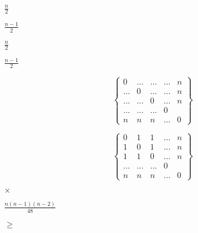 \documentclass[10pt]{book}
\begin{document}
\begin{mdSnippets}
\begin{mdInlineSnippet}[c53191173d224aa0c56749fb3bce82f7]
$\frac{n}{2}$\end{mdInlineSnippet}%
\begin{mdInlineSnippet}[131b6f4857a0be5dab02e842453d21fd]%
$\frac{n - 1}{2}$\end{mdInlineSnippet}%
\begin{mdInlineSnippet}[c53191173d224aa0c56749fb3bce82f7]%
$\frac{n}{2}$\end{mdInlineSnippet}%
\begin{mdInlineSnippet}[131b6f4857a0be5dab02e842453d21fd]%
$\frac{n - 1}{2}$\end{mdInlineSnippet}%
\begin{mdDisplaySnippet}[2be68de93974c9453694d3c65578e57b]%
\[ \left\{
 \begin{matrix}
   0 & ... & ... & ... & n\\
   ... & 0 & ... & ... & n\\
   ... & ... & 0 & ... & n\\
   ... & ... & ... & 0 \\
   n & n & n & ... & 0
  \end{matrix}
  \right\}
\]%
\end{mdDisplaySnippet}%
\begin{mdDisplaySnippet}%
\[ \left\{
 \begin{matrix}
   0 & 1 & 1 & ... & n\\
   1 & 0 & 1 & ... & n\\
   1 & 1 & 0 & ... & n\\
   ... & ... & ... & 0 \\
   n & n & n & ... & 0
  \end{matrix}
  \right\}
\]%
\end{mdDisplaySnippet}%
\begin{mdInlineSnippet}[60c13e05d3ec8c10b8564eae7023d9db]%
$\times$\end{mdInlineSnippet}%
\begin{mdInlineSnippet}[f9d27f76c022611181620b242288ec33]%
$\frac{n( n - 1 )( n - 2) }{48}$\end{mdInlineSnippet}%
\begin{mdInlineSnippet}%
$\geq$\end{mdInlineSnippet}%
\begin{mdInlineSnippet}%

\end{mdInlineSnippet}
\end{mdSnippets}
\end{document}
